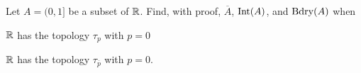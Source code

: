 Let $A = (0,1]$ be a subset of $\mathbb{R}$. Find, with proof, $\overline{A}$, $\text{Int}(A)$, and $\text{Bdry}(A)$ when
	\ba
	\item $\mathbb{R}$ has the topology $\tau_{p}$ with $p = 0$
	
	\item $\mathbb{R}$ has the topology $\tau_{\overline{p}}$ with $p = 0$.
	
	\ea
	
\begin{comment}

\ExerciseSolution

	\ba
	\item 
	\begin{itemize}
	\item Since $\R \setminus A = (-\infty,0] \cup (1,\infty)$ contains $0$, we see that $\R \setminus A$ is open. This makes $A$ a closed set, so $\overline{A} = A$. 
	\item We know that $\Int(A)$ is the largest open set contained in $A$. But no nonempty subset of $A$ is open, since $0 \notin A$. Thus, $\Int(A) = \emptyset$. 
	\item Recall that $\Bdry(A) = \overline{A} \cap \overline{\R \setminus A}$. To determine $\overline{\R \setminus A}$, we note that $\overline{\R \setminus A}$ is the smallest closed set that contains $\R \setminus A$. Any set $B$ that contains $\R \setminus A$ also contains $0$, so $\R \setminus B$ does not contain $0$ and is therefore not open. Thus, the only closed set that contains $\R \setminus A$ is $\R$, and so $\overline{\R \setminus A} = \R$. This makes $\Bdry(A) = \overline{A} \cap \overline{\R \setminus A} = \overline{A} = A$. 
	\end{itemize}
	
\item 
	\begin{itemize}
	\item To find $\overline{A}$, we use the fact that $\overline{A}$ is the smallest closed set that contains $A$. Let $B$ be a closed set that contains $A$. Since $B$ is closed, we know that $\R \setminus B$ is open and that $0$ is not in $\R \setminus B$. Thus, $0 \in B$. The smallest set that contains both $A$ and $0$ is $[0,1]$, so $\overline{A} = [0,1]$. 
	\item Since $A$ does not contain $0$, it is the case that $A$ is open and so $\Int(A) = A$. 
	\item The fact that $A$ is open means that $\R \setminus A$ is closed and so $\overline{\R \setminus A} = \R \setminus A$. Then 
	\[\Bdry(A) = \overline{A} \cap \overline{\R \setminus A} = [0,1] \cap \left((-\infty,0] \cup (1,\infty)\right) = \{0\}.\]
	\end{itemize}
	
	\ea


\end{comment}



